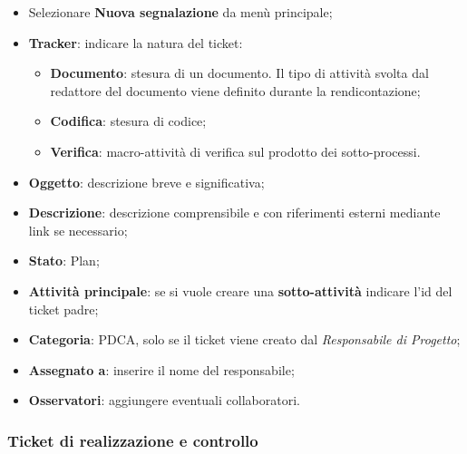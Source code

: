 \begin{itemize}


\item Selezionare \textbf{Nuova segnalazione} da men\`{u} principale; 
\item \textbf{Tracker}: indicare la natura del ticket: 
	\begin{itemize}
	\item \textbf{Documento}: stesura di un documento. Il tipo di attivit\`{a} svolta dal redattore del documento viene definito durante la rendicontazione; 
	\item \textbf{Codifica}: stesura di codice; 
	\item \textbf{Verifica}: macro-attivit\`{a} di verifica sul prodotto dei sotto-processi. 


	\end{itemize}

\item \textbf{Oggetto}: descrizione breve e significativa; 
\item \textbf{Descrizione}: descrizione comprensibile e con riferimenti esterni mediante link se necessario; 
\item \textbf{Stato}: Plan; 
\item \textbf{Attivit\`{a} principale}: se si vuole creare una \textbf{sotto-attivit\`{a}} indicare l’id del ticket 
padre; 
\item \textbf{Categoria}: PDCA, solo se il ticket viene creato dal \emph{Responsabile di Progetto}; 
\item \textbf{Assegnato a}: inserire il nome del responsabile; 
\item \textbf{Osservatori}: aggiungere eventuali collaboratori.
\end{itemize}  


\subsubsection{Ticket di realizzazione e controllo} 


